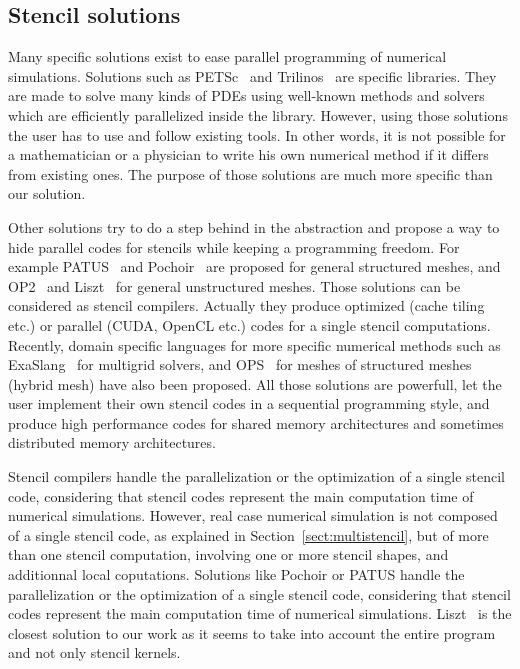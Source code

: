\subsection{Stencil solutions}

Many specific solutions exist to ease parallel programming of numerical simulations. Solutions such as PETSc~\cite{petsc-efficient} and Trilinos~\cite{Trilinos-Overview} are specific libraries. They are made to solve many kinds of PDEs using well-known methods and solvers which are efficiently parallelized inside the library. However, using those solutions the user has to use and follow existing tools. In other words, it is not possible for a mathematician or a physician to write his own numerical method if it differs from existing ones. The purpose of those solutions are much more specific than our solution.

Other solutions try to do a step behind in the abstraction and propose a way to hide parallel codes for stencils while keeping a programming freedom. For example PATUS~\cite{citeulike12258902} and Pochoir~\cite{spaaTangCKLL11} are proposed for general structured meshes, and OP2~\cite{Giles2011} and Liszt~\cite{DeVito2011LDS} for general unstructured meshes. Those solutions can be considered as stencil compilers. Actually they produce optimized (cache tiling etc.) or parallel (CUDA, OpenCL etc.) codes for a single stencil computations.
Recently, domain specific languages for more specific numerical methods such as ExaSlang~\cite{Schmitt:2014:EDL:2691166.2691171} for multigrid solvers, and OPS~\cite{Reguly:2014:ODS:2691166.2691173} for meshes of structured meshes (hybrid mesh) have also been proposed. 
All those solutions are powerfull, let the user implement their own stencil codes in a sequential programming style, and produce high performance codes for shared memory architectures and sometimes distributed memory architectures. 

Stencil compilers handle the parallelization or the optimization of a single stencil code, considering that stencil codes represent the main computation time of numerical simulations. However, real case numerical simulation is not composed of a single stencil code, as explained in Section~\ref{sect:multistencil}, but of more than one stencil computation, involving one or more stencil shapes, and additionnal local coputations. Solutions like Pochoir or PATUS handle the parallelization or the optimization of a single stencil code, considering that stencil codes represent the main computation time of numerical simulations. Liszt~\cite{DeVito2011LDS} is the closest solution to our work as it seems to take into account the entire program and not only stencil kernels. 

